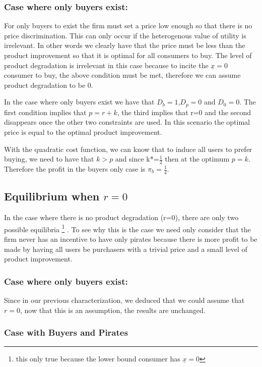 \documentclass{article}
\begin{document}
\subsubsection{Case where only buyers exist:}

For only buyers to exist the firm must set a price low enough so that there is no price discrimination. This can only occur if the heterogenous value of utility is irrelevant. In other words we clearly have that the price must be less than the product improvement so that it is optimal for all consumers to buy. The level of product degradation is irrelevant in this case because to incite the $\underline{x}=0$ consumer to buy, the above condition must be met, therefore we can assume product degradation to be 0. 

In the case where only buyers exist we have that $D_b = 1$,$D_p = 0$ and $D_0 = 0$. The first condition implies that $p=r+k$, the third implies that r=0 and the second disappears once the other two constraints are used. In this scenario the optimal price is equal to the optimal product improvement.  

With the quadratic cost function, we can know that to induce all users to prefer buying, we need to have that $k>p$ and since k*=$\frac{1}{2}$ then at the optimum $p=k$. Therefore the profit in the buyers only case is $ \pi_{b} =\frac{1}{4}$. 

\subsection{Equilibrium when $r=0$}

In the case where there is no product degradation (r=0), there are only two possible equilibria \footnote{this only true because the lower bound consumer has $\underline{x}=0$ } . To see why this is the case we need only consider that the firm never has an incentive to have only pirates because there is more profit to be made by having all users be purchasers with a trivial price and a small level of product improvement. 

\subsubsection{Case where only buyers exist:}

Since in our previous characterization, we deduced that we could assume that $r=0$, now that this is an assumption, the results are unchanged. 

\subsubsection{Case with Buyers and Pirates}
\end{document}
